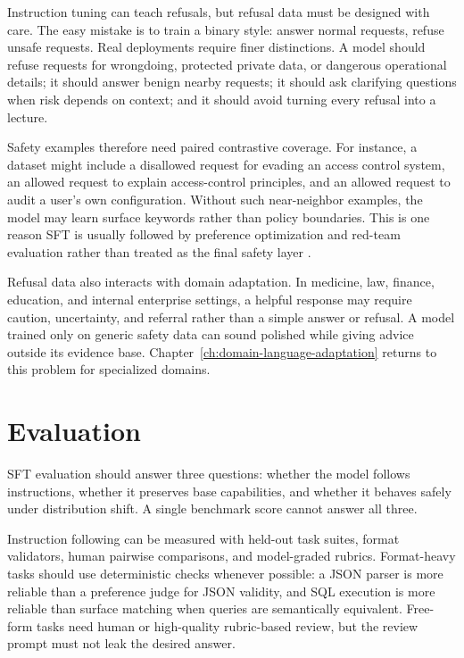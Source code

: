 Instruction tuning can teach refusals, but refusal data must be designed with care. The easy mistake is to train a binary style: answer normal requests, refuse unsafe requests. Real deployments require finer distinctions. A model should refuse requests for wrongdoing, protected private data, or dangerous operational details; it should answer benign nearby requests; it should ask clarifying questions when risk depends on context; and it should avoid turning every refusal into a lecture.

Safety examples therefore need paired contrastive coverage. For instance, a dataset might include a disallowed request for evading an access control system, an allowed request to explain access-control principles, and an allowed request to audit a user's own configuration. Without such near-neighbor examples, the model may learn surface keywords rather than policy boundaries. This is one reason SFT is usually followed by preference optimization and red-team evaluation rather than treated as the final safety layer \cite{ouyang2022training,touvron2023llama2}.

Refusal data also interacts with domain adaptation. In medicine, law, finance, education, and internal enterprise settings, a helpful response may require caution, uncertainty, and referral rather than a simple answer or refusal. A model trained only on generic safety data can sound polished while giving advice outside its evidence base. Chapter~\ref{ch:domain-language-adaptation} returns to this problem for specialized domains.

\section{Evaluation}
\label{sec:sft-evaluation}

SFT evaluation should answer three questions: whether the model follows instructions, whether it preserves base capabilities, and whether it behaves safely under distribution shift. A single benchmark score cannot answer all three.

Instruction following can be measured with held-out task suites, format validators, human pairwise comparisons, and model-graded rubrics. Format-heavy tasks should use deterministic checks whenever possible: a JSON parser is more reliable than a preference judge for JSON validity, and SQL execution is more reliable than surface matching when queries are semantically equivalent. Free-form tasks need human or high-quality rubric-based review, but the review prompt must not leak the desired answer.

